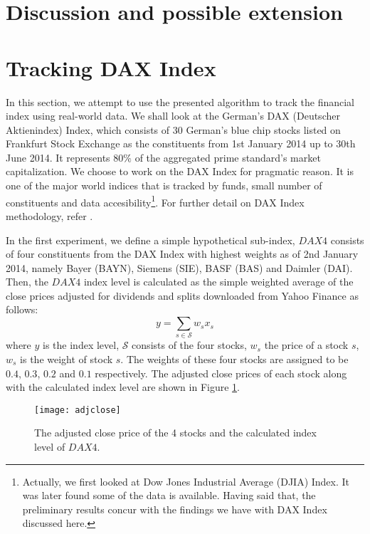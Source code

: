 \section{Discussion and possible extension}

\section{Tracking DAX Index}
In this section, we attempt to use the presented algorithm to track the financial index using real-world data. We shall look at the German's DAX (Deutscher Aktienindex) Index, which consists of 30 German's blue chip stocks listed on Frankfurt Stock Exchange as the constituents from 1st January 2014 up to 30th June 2014. It represents $80\%$ of the aggregated prime standard's market capitalization. We choose to work on the DAX Index for pragmatic reason. It is one of the major world indices that is tracked by funds, small number of constituents and data accesibility\footnote{Actually, we first looked at Dow Jones Industrial Average (DJIA) Index. It was later found some of the data is available. Having said that, the preliminary results concur with the findings we have with DAX Index discussed here.}. For further detail on DAX Index methodology, refer \cite{DAX14}.

In the first experiment, we define a simple hypothetical sub-index, $DAX4$ consists of four constituents from the DAX Index with highest weights as of 2nd January 2014, namely Bayer (BAYN), Siemens (SIE), BASF (BAS) and Daimler (DAI). Then, the $DAX4$ index level is calculated as the simple weighted average of the close prices adjusted for dividends and splits downloaded from Yahoo Finance as follows:
\begin{equation}
  y = \sum_{s \in \mathcal{S}} w_s x_s
\end{equation}
where $y$ is the index level, $\mathcal{S}$ consists of the four stocks, $w_s$ the price of a stock $s$, $w_s$ is the weight of stock $s$. The weights of these four stocks are assigned to be $0.4$, $0.3$, $0.2$ and $0.1$ respectively. The adjusted close prices of each stock along with the calculated index level are shown in Figure \ref{fig:adjclose}.

\begin{figure}[htbp]
 \centering
 \texttt{[image: adjclose]}
 \caption{The adjusted close price of the 4 stocks and the calculated index level of $DAX4$.}
 \label{fig:adjclose}
\end{figure}


